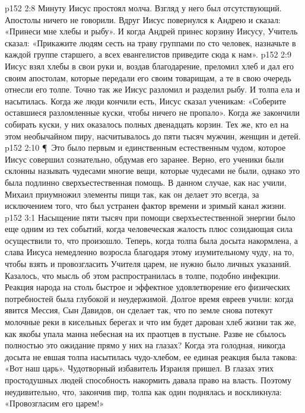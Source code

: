 \vs p152 2:8 Минуту Иисус простоял молча. Взгляд у него был отсутствующий. Апостолы ничего не говорили. Вдруг Иисус повернулся к Андрею и сказал: «Принеси мне хлебы и рыбу». И когда Андрей принес корзину Иисусу, Учитель сказал: «Прикажите людям сесть на траву группами по сто человек, назначьте в каждой группе старшего, а всех евангелистов приведите сюда к нам».
\vs p152 2:9 Иисус взял хлебы в свои руки и, воздав благодарение, преломил хлеб и дал его своим апостолам, которые передали его своим товарищам, а те в свою очередь отнесли его толпе. Точно так же Иисус разломил и разделил рыбу. И толпа ела и насытилась. Когда же люди кончили есть, Иисус сказал ученикам: «Соберите оставшиеся разломленные куски, чтобы ничего не пропало». Когда же закончили собирать куски, у них оказалось полных двенадцать корзин. Тех же, кто ел на этом необычайном пиру, насчитывалось до пяти тысяч мужчин, женщин и детей.
\vs p152 2:10 \P\ Это было первым и единственным естественным чудом, которое Иисус совершил сознательно, обдумав его заранее. Верно, его ученики были склонны называть чудесами многие вещи, которые чудесами не были, однако это была подлинно сверхъестественная помощь. В данном случае, как нас учили, Михаил приумножил элементы пищи так, как он делает это всегда, за исключением того, что был устранен фактор времени и зримый канал жизни.
\vs p152 3:1 Насыщение пяти тысяч при помощи сверхъестественной энергии было еще одним из тех событий, когда человеческая жалость плюс созидающая сила осуществили то, что произошло. Теперь, когда толпа была досыта накормлена, а слава Иисуса немедленно возросла благодаря этому изумительному чуду, на то, чтобы взять и провозгласить Учителя царем, не нужно было личных указаний. Казалось, что мысль об этом распространилась в толпе, подобно инфекции. Реакция народа на столь быстрое и эффектное удовлетворение его физических потребностей была глубокой и неудержимой. Долгое время евреев учили: когда явится Мессия, Сын Давидов, он сделает так, что по земле снова потекут молочные реки в кисельных берегах и что им будет дарован хлеб жизни так же, как якобы упала манна небесная на их праотцев в пустыне. Разве не сбылось полностью это ожидание прямо у них на глазах? Когда эта голодная, никогда досыта не евшая толпа насытилась чудо\hyp{}хлебом, ее единая реакция была такова: «Вот наш царь». Чудотворный избавитель Израиля пришел. В глазах этих простодушных людей способность накормить давала право на власть. Поэтому неудивительно, что, закончив пир, толпа как один поднялась и воскликнула: «Провозгласим его царем!»
